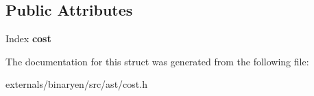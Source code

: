 \subsection*{Public Attributes}
\begin{DoxyCompactItemize}
\item 
\mbox{\label{structwasm_1_1_cost_analyzer_ab7aeecd95286d16170e3771135f2d9da}} 
Index {\bfseries cost}
\end{DoxyCompactItemize}


The documentation for this struct was generated from the following file\+:\begin{DoxyCompactItemize}
\item 
externals/binaryen/src/ast/cost.\+h\end{DoxyCompactItemize}
